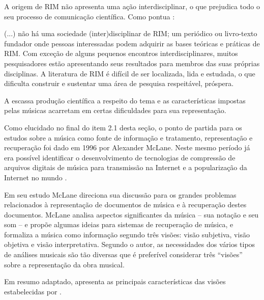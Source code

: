 A origem de RIM não apresenta uma ação interdisciplinar, o que prejudica todo o seu processo de comunicação científica. Como pontua :

\begin{citacao}
(...) não há uma sociedade (inter)disciplinar de RIM; um periódico ou livro-texto fundador onde pessoas interessadas podem adquirir as bases teóricas e práticas de RIM. Com exceção de alguns pequenos encontros interdisciplinares, muitos pesquisadores estão apresentando seus resultados para membros das suas próprias disciplinas. A literatura de RIM é difícil de ser localizada, lida e estudada, o que dificulta construir e sustentar uma área de pesquisa respeitável, próspera.
\end{citacao}

A escassa produção científica a respeito do tema e as características impostas pelas músicas acarretam em certas dificuldades para sua representação.

Como elucidado no final do item 2.1 desta seção, o ponto de partida para os estudos sobre a música como fonte de informação e tratamento, representação e recuperação foi dado em 1996 por Alexander McLane. Neste mesmo período já era possível identificar o desenvolvimento de tecnologias de compressão de arquivos digitais de música para transmissão na Internet e a popularização da Internet no mundo \cite{santini&souza2007}.

Em seu estudo McLane direciona sua discussão para os grandes problemas relacionados à representação de documentos de música e à recuperação destes documentos. McLane analisa aspectos significantes da música – sua notação e seu som – e propõe algumas ideias para sistemas de recuperação de música, e formaliza a música como informação segundo três visões: visão subjetiva, visão objetiva e visão interpretativa. Segundo o autor, as necessidades dos vários tipos de análises musicais são tão diversas que é preferível considerar três “visões” sobre a representação da obra musical.

Em resumo adaptado,  apresenta as principais características das visões estabelecidas por .

